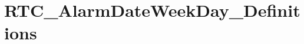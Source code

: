 \hypertarget{group___r_t_c___alarm_date_week_day___definitions}{\section{R\-T\-C\-\_\-\-Alarm\-Date\-Week\-Day\-\_\-\-Definitions}
\label{group___r_t_c___alarm_date_week_day___definitions}
}
